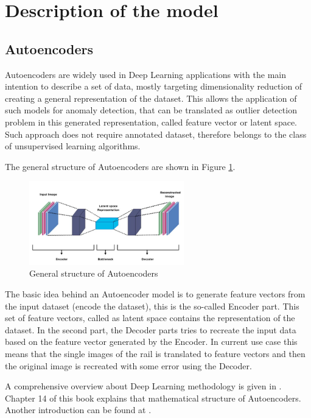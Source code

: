 \section{Description of the model} \label{model}
\subsection{Autoencoders}
Autoencoders are widely used in Deep Learning applications with the main intention
to describe a set of data, mostly targeting dimensionality reduction of creating
a general representation of the dataset.
This allows the application of such models for anomaly detection, that can be translated
as outlier detection problem in this generated representation,
called feature vector or latent space.
Such approach does not require annotated dataset, therefore belongs to the class of
unsupervised learning algorithms.

The general structure of Autoencoders are shown in Figure \ref{fig:autoencoder}.

\begin{figure}[!ht]
    \centering
    \includegraphics[width=0.6\textwidth,trim={0 0 0 1cm},clip]{./tex_images/autoencoder.jpeg}
    \caption{General structure of Autoencoders \cite{khosla_auto_2021}}
    \label{fig:autoencoder}
\end{figure}

The basic idea behind an Autoencoder model is to generate feature vectors from the input
dataset (encode the dataset), this is the so-called Encoder part.
This set of feature vectors, called as latent space contains the representation of the dataset.
In the second part, the Decoder parts tries to recreate the input data based on the feature vector
generated by the Encoder.
In current use case this means that the single images of the rail is translated to feature vectors
and then the original image is recreated with some error using the Decoder.

A comprehensive overview about Deep Learning methodology is given in \cite{Goodfellow-et-al-2016}.
Chapter 14 of this book explains that mathematical structure of Autoencoders.
Another introduction can be found at \cite{_autoencoder_2023}.

